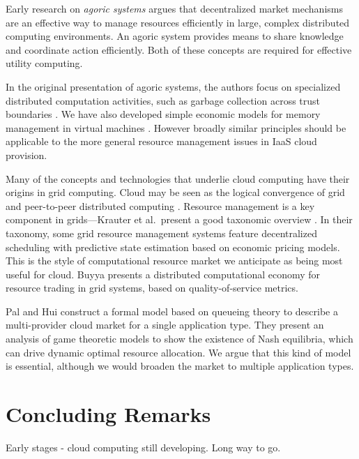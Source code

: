 \documentclass[conference,10pt]{IEEEtran}
\begin{document}
Early research on \emph{agoric systems}  \cite{miller88markets} argues that decentralized market mechanisms are an effective way to manage resources efficiently in large, complex distributed computing environments. An agoric system provides means to share knowledge and coordinate action efficiently. Both of these concepts are required for effective utility computing.

In the original presentation of agoric systems, the authors focus on specialized distributed computation activities, such as garbage collection across trust boundaries \cite{miller88incentive}. We have also developed simple economic models for memory management in virtual machines \cite{singer10economics,cameron15forseti}.  However broadly similar principles should be applicable to the more general resource management issues in IaaS cloud provision.


Many of the concepts and technologies that underlie cloud computing have their origins in grid computing.
Cloud may be seen as the logical convergence of grid and peer-to-peer distributed computing \cite{foster03death}.
Resource management is a key component in grids---Krauter et al.\ present a good taxonomic overview \cite{krauter02taxonomy}. In their taxonomy, some grid resource management systems feature decentralized scheduling with predictive state estimation based on economic pricing models. This is the style of computational resource market we anticipate as being most useful for cloud.
Buyya \cite{buyya02economic} presents a distributed computational economy for resource trading in grid systems, based on quality-of-service metrics.

Pal and Hui \cite{pal13economic} construct a formal model based on queueing theory to describe a multi-provider cloud market for a single application type. They present an analysis of game theoretic models to show the existence of Nash equilibria, which can drive dynamic optimal resource allocation.
We argue that this kind of model is essential, although we would broaden the market to multiple application types.


\section{Concluding Remarks}
\label{sec-concl}

Early stages - cloud computing still developing. Long way to go.




\end{document}
